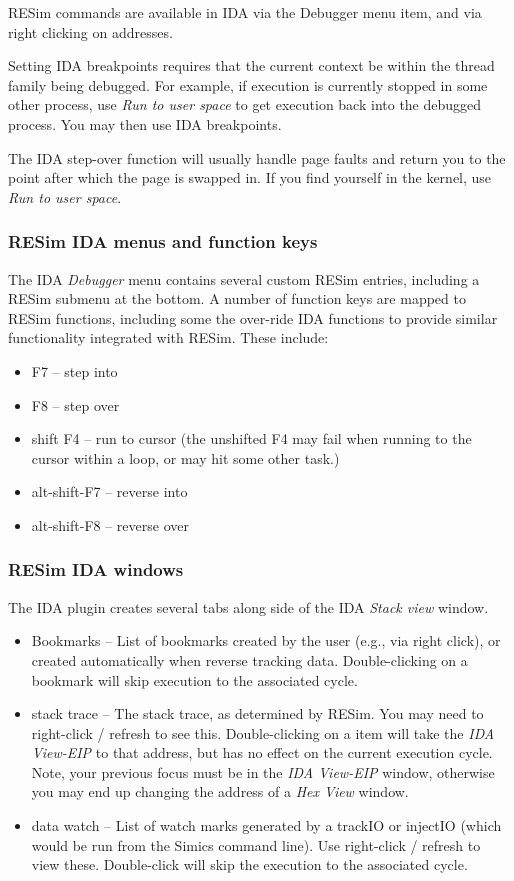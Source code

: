 \documentclass[titlepage]{article}
\begin{document}
RESim commands are available in IDA via the Debugger menu item, and via right clicking on addresses.  

Setting IDA breakpoints requires that the current context be within the thread family being debugged.  For example, if execution is currently 
stopped in some other process, use \textit{Run to user space} to get execution back into the debugged process.  You may then use IDA breakpoints.

The IDA step-over function will usually handle page faults and return you to the point after which the page is swapped in.  If you find yourself in
the kernel, use \textit{Run to user space}.

\subsubsection{RESim IDA menus and function keys}
The IDA \textit{Debugger} menu contains several custom RESim entries, including a RESim submenu at the bottom.
A number of function keys are mapped to RESim functions, including some the over-ride IDA functions to provide similar functionality integrated with RESim.  
These include:
\begin{itemize}
\item F7 -- step into
\item F8 -- step over
\item shift F4 -- run to cursor (the unshifted F4 may fail when running to the cursor within a loop, or may hit some other task.)
\item alt-shift-F7 -- reverse into
\item alt-shift-F8 -- reverse over
\end{itemize}

\subsubsection{RESim IDA windows}
The IDA plugin creates several tabs along side of the IDA \textit{Stack view} window.  
\begin{itemize}
\item Bookmarks -- List of bookmarks created by the user (e.g., via right click), or created automatically when reverse tracking data.
Double-clicking on a bookmark will skip execution to the associated cycle.
\item stack trace -- The stack trace, as determined by RESim.  You may need to right-click / refresh to see this.  Double-clicking on a item
will take the \textit{IDA View-EIP} to that address, but has no effect on the current execution cycle.  Note, your previous focus must be in
the \textit{IDA View-EIP} window, otherwise you may end up changing the address of a \textit{Hex View} window.
\item data watch -- List of watch marks generated by a trackIO or injectIO (which would be run from the Simics command line).  
Use right-click / refresh to view these.  Double-click will skip the execution to the associated cycle.
\end{itemize}
\end{document}
